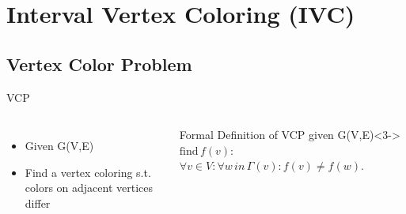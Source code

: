 \section{Interval Vertex Coloring (IVC)}
\subsection*{Vertex Color Problem}
\begin{frame}{VCP}
  \begin{columns}
      \begin{itemize}
        \item<1-> Given G(V,E)
        \item<2-> Find a vertex coloring s.t. colors on adjacent vertices differ
      \end{itemize}
      \begin{block}{Formal Definition of VCP given G(V,E)}<3->
        $\text{find} \, f(v):$
        $\forall v\in V:\forall w \, in \, \Gamma(v): f(v) \neq f(w).$
      \end{block}
      
    \centering
    

\end{columns}
\end{frame}
